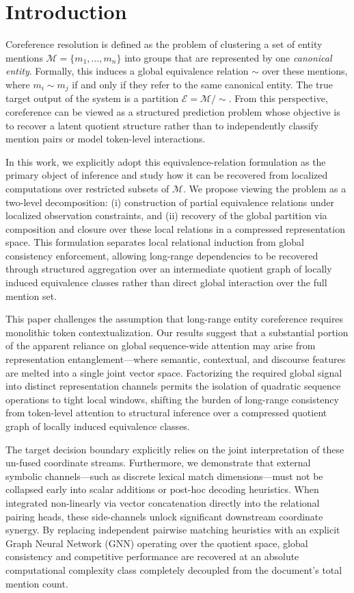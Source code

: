 \documentclass[12pt]{article}
\begin{document}
	\section{Introduction}\label{sec:intro}
	Coreference resolution is defined as the problem of clustering a set of entity mentions $\mathcal{M} = \{m_1, \ldots, m_n\}$ into groups that are represented by one \textit{canonical entity}. Formally, this induces a global equivalence relation $\sim$ over these mentions, where $m_i \sim m_j$ if and only if they refer to the same canonical entity. The true target output of the system is a partition $\mathcal{E} = \mathcal{M} / \sim$. From this perspective, coreference can be viewed as a structured prediction problem whose objective is to recover a latent quotient structure rather than to independently classify mention pairs or model token-level interactions.
	
	In this work, we explicitly adopt this equivalence-relation formulation as the primary object of inference and study how it can be recovered from localized computations over restricted subsets of $\mathcal{M}$. We propose viewing the problem as a two-level decomposition: (i) construction of partial equivalence relations under localized observation constraints, and (ii) recovery of the global partition via composition and closure over these local relations in a compressed representation space. This formulation separates local relational induction from global consistency enforcement, allowing long-range dependencies to be recovered through structured aggregation over an intermediate quotient graph of locally induced equivalence classes rather than direct global interaction over the full mention set.
	
	This paper challenges the assumption that long-range entity coreference requires monolithic token contextualization. Our results suggest that a substantial portion of the apparent reliance on global sequence-wide attention may arise from representation entanglement—where semantic, contextual, and discourse features are melted into a single joint vector space. Factorizing the required global signal into distinct representation channels permits the isolation of quadratic sequence operations to tight local windows, shifting the burden of long-range consistency from token-level attention to structural inference over a compressed quotient graph of locally induced equivalence classes.
	
	The target decision boundary explicitly relies on the joint interpretation of these un-fused coordinate streams. Furthermore, we demonstrate that external symbolic channels—such as discrete lexical match dimensions—must not be collapsed early into scalar additions or post-hoc decoding heuristics. When integrated non-linearly via vector concatenation directly into the relational pairing heads, these side-channels unlock significant downstream coordinate synergy. By replacing independent pairwise matching heuristics with an explicit Graph Neural Network (GNN) operating over the quotient space, global consistency and competitive performance are recovered at an absolute computational complexity class completely decoupled from the document's total mention count.
	
\end{document}
